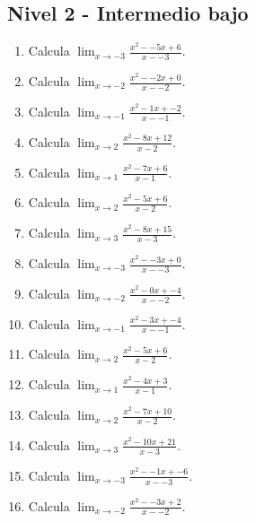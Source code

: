 \documentclass[11pt,a4paper]{article}
\begin{document}
\subsection{Nivel 2 - Intermedio bajo}

\begin{enumerate}[label=\textbf{E\arabic*.},start=221]

\item Calcula $\displaystyle\lim_{x\to -3}\frac{x^2--5x+6}{x--3}$. 

\item Calcula $\displaystyle\lim_{x\to -2}\frac{x^2--2x+0}{x--2}$. 

\item Calcula $\displaystyle\lim_{x\to -1}\frac{x^2-1x+-2}{x--1}$. 

\item Calcula $\displaystyle\lim_{x\to 2}\frac{x^2-8x+12}{x-2}$. 

\item Calcula $\displaystyle\lim_{x\to 1}\frac{x^2-7x+6}{x-1}$. 

\item Calcula $\displaystyle\lim_{x\to 2}\frac{x^2-5x+6}{x-2}$. 

\item Calcula $\displaystyle\lim_{x\to 3}\frac{x^2-8x+15}{x-3}$. 

\item Calcula $\displaystyle\lim_{x\to -3}\frac{x^2--3x+0}{x--3}$. 

\item Calcula $\displaystyle\lim_{x\to -2}\frac{x^2-0x+-4}{x--2}$. 

\item Calcula $\displaystyle\lim_{x\to -1}\frac{x^2-3x+-4}{x--1}$. 

\item Calcula $\displaystyle\lim_{x\to 2}\frac{x^2-5x+6}{x-2}$. 

\item Calcula $\displaystyle\lim_{x\to 1}\frac{x^2-4x+3}{x-1}$. 

\item Calcula $\displaystyle\lim_{x\to 2}\frac{x^2-7x+10}{x-2}$. 

\item Calcula $\displaystyle\lim_{x\to 3}\frac{x^2-10x+21}{x-3}$. 

\item Calcula $\displaystyle\lim_{x\to -3}\frac{x^2--1x+-6}{x--3}$. 

\item Calcula $\displaystyle\lim_{x\to -2}\frac{x^2--3x+2}{x--2}$. 


\end{enumerate}
\end{document}
